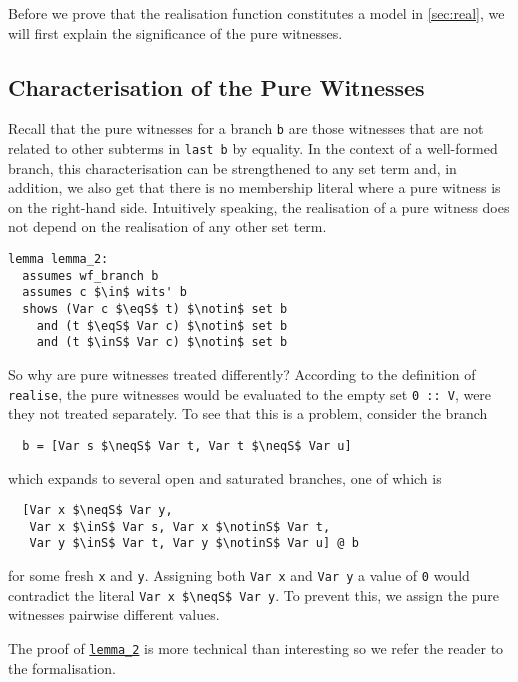\documentclass[sigplan,10pt,anonymous,review]{acmart}
\newcommand{\inS}{\in_\text{s}}
\newcommand{\notinS}{\notin_\text{s}}
\newcommand{\eqS}{=_\text{s}}
\newcommand{\neqS}{\neq_\text{s}}
\begin{document}
Before we prove that the realisation function constitutes a model in \autoref{sec:real}, we will first explain the significance of the pure witnesses.

\subsection{Characterisation of the Pure Witnesses\label{sec:pwits}}
Recall that the pure witnesses for a branch \lstinline!b! are those witnesses that are not related to other subterms in \lstinline!last b! by equality.
In the context of a well-formed branch, this characterisation can be strengthened to any set term and, in addition, we also get that there is no membership literal where a pure witness is on the right-hand side.
Intuitively speaking, the realisation of a pure witness does not depend on the realisation of any other set term.
\begin{lstlisting}[label={lst:lemma_2}]
lemma lemma_2:
  assumes wf_branch b
  assumes c $\in$ wits' b
  shows (Var c $\eqS$ t) $\notin$ set b
    and (t $\eqS$ Var c) $\notin$ set b
    and (t $\inS$ Var c) $\notin$ set b
\end{lstlisting}
So why are pure witnesses treated differently?
According to the definition of \lstinline!realise!, the pure witnesses would be evaluated to the empty set \lstinline!0 :: V!, were they not treated separately. 
To see that this is a problem, consider the branch
\begin{lstlisting}
  b = [Var s $\neqS$ Var t, Var t $\neqS$ Var u]
\end{lstlisting}
which expands to several open and saturated branches, one of which is
\begin{lstlisting}
  [Var x $\neqS$ Var y,
   Var x $\inS$ Var s, Var x $\notinS$ Var t,
   Var y $\inS$ Var t, Var y $\notinS$ Var u] @ b
\end{lstlisting}
for some fresh \lstinline!x! and \lstinline!y!.
Assigning both \lstinline!Var x! and \lstinline!Var y! a value of \lstinline!0! would contradict the literal \lstinline!Var x $\neqS$ Var y!.
To prevent this, we assign the pure witnesses pairwise different values.

The proof of \hyperref[lst:lemma_2]{\lstinline!lemma_2!} is more technical than interesting so we refer the reader to the formalisation.
\end{document}
